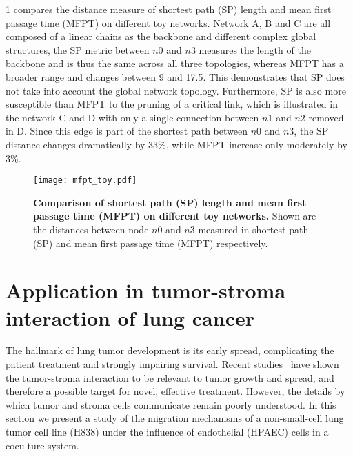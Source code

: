 \ref{fig:mfpt_toy} compares the distance measure of shortest path (SP) length
and mean first passage time (MFPT) on different toy networks. Network A, B and
C are all composed of a linear chains as the backbone and different complex 
global structures, the SP metric between $n0$ and $n3$ 
measures the length of the backbone and is 
thus the same across all three topologies, whereas MFPT has a broader range
and changes between 9 and 17.5. This demonstrates that SP does not take into
account the global network topology. Furthermore, SP is also more susceptible
than MFPT to the pruning of a critical link, which is illustrated in the 
network C and D with only a single connection between $n1$ and $n2$ removed
in D. Since this edge is part of the shortest path between $n0$ and $n3$, the
SP distance changes dramatically by 33\%, while MFPT increase only moderately
by 3\%.

\begin{figure}[!ht]
\begin{center}
\texttt{[image: mfpt\_toy.pdf]}
\end{center}
\caption[Toy example of SP and MFPT on different topologies]{
{\bf Comparison of shortest path (SP) length and mean first passage time 
(MFPT) on different toy networks.}
Shown are the distances between node $n0$ and $n3$ measured in shortest path 
(SP) and mean first passage time (MFPT) respectively.
}
\label{fig:mfpt_toy}
\end{figure}

\section{Application in tumor-stroma interaction of lung cancer}

The hallmark of lung tumor development is its early spread, 
complicating the patient treatment and strongly impairing survival.
Recent studies~\citep{Mueller2004} have shown the tumor-stroma interaction to be relevant to 
tumor growth and spread, and therefore a possible target for
novel, effective treatment. 
However, 
the details by which tumor and stroma cells communicate remain poorly 
understood. In this section we present a study
of the migration mechanisms of a non-small-cell lung 
tumor cell line (H838) under the influence of endothelial (HPAEC) cells 
in a coculture system.

